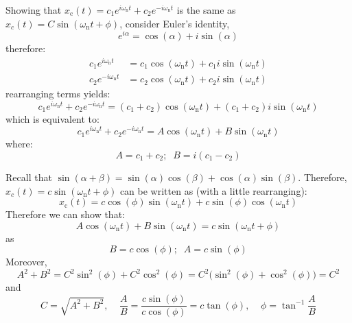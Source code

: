 \documentclass[12pt,letter]{article}
\begin{document}
\begin{bookproof}
Showing that $x_\text{c}(t) = c_1 e ^{i \omega_\text{n} t} + c_2 e ^{-i \omega_\text{n} t} $ is the same as $x_c(t) = C \sin(\omega_\text{n} t + \phi) $, consider Euler's identity, 
\begin{equation}
e^{i \alpha} = \cos(\alpha) + i \sin(\alpha)
\end{equation}
therefore:
\begin{align}
c_1 e ^{i \omega_\text{n} t}   &= c_1 \cos(\omega_\text{n} t) + c_1 i \sin(\omega_\text{n} t)  \\
c_2 e ^{- i \omega_\text{n} t}   &= c_2 \cos(\omega_\text{n} t) + c_2 i \sin(\omega_\text{n} t)   \nonumber
\end{align}
rearranging terms yields:
\begin{equation}
c_1 e ^{i \omega_\text{n} t} + c_2 e ^{- i \omega_\text{n} t}  = (c_1+c_2) \cos(\omega_\text{n} t) + (c_1+c_2) i \sin(\omega_\text{n} t) 
\end{equation}
which is equivalent to:
\begin{equation}
c_1 e ^{i \omega_\text{n} t} + c_2 e ^{- i \omega_\text{n} t}  = A \cos(\omega_\text{n} t) + B \sin(\omega_\text{n} t) 
\end{equation}
where:
\begin{equation}
A = c_1 + c_2; \;\; B = i(c_1 - c_2)
\end{equation}


Recall that $\sin(\alpha + \beta) = \sin(\alpha) \cos(\beta) + \cos(\alpha) \sin(\beta)$. Therefore, $x_c(t) = c \sin(\omega_\text{n} t + \phi)$ can be written as (with a little rearranging):
\begin{equation}
x_\text{c}(t) = c \cos(\phi) \sin(\omega_\text{n} t) + c \sin(\phi) \cos(\omega_\text{n} t)
\end{equation}
Therefore we can show that: 
\begin{equation}
A \cos(\omega_\text{n} t) + B \sin(\omega_\text{n} t) = c \sin(\omega_\text{n} t + \phi) 
\end{equation}
as
\begin{equation}
B = c\cos(\phi); \;\; A = c\sin(\phi)
\end{equation}
Moreover, 
\begin{equation}
A^2 + B^2 = C^2 \sin^2(\phi) + C^2 \cos^2(\phi) = C^2 \big(  \sin^2(\phi) + \cos^2(\phi)\big) = C^2
\end{equation}
and 
\begin{equation}
C = \sqrt{A^2 + B^2}, \;\;\;\;  \frac{A}{B} = \frac{c \sin(\phi)}{c \cos(\phi)} = c \tan(\phi), \;\;\;\;  \phi = \tan^{-1} \frac{A}{B}
\end{equation}

\end{bookproof}
\end{document}

